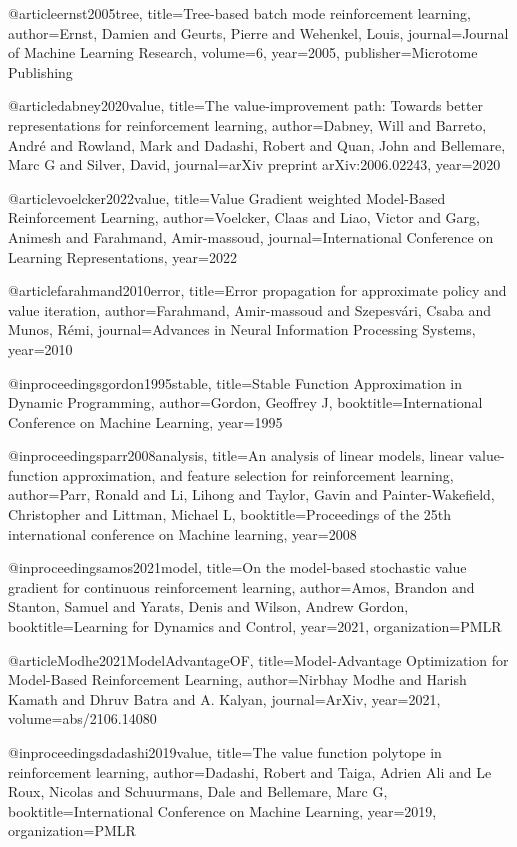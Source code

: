 @article{ernst2005tree,
  title={Tree-based batch mode reinforcement learning},
  author={Ernst, Damien and Geurts, Pierre and Wehenkel, Louis},
  journal={Journal of Machine Learning Research},
  volume={6},
  year={2005},
  publisher={Microtome Publishing}
}

@article{dabney2020value,
  title={The value-improvement path: Towards better representations for reinforcement learning},
  author={Dabney, Will and Barreto, Andr{\'e} and Rowland, Mark and Dadashi, Robert and Quan, John and Bellemare, Marc G and Silver, David},
  journal={arXiv preprint arXiv:2006.02243},
  year={2020}
}

@article{voelcker2022value,
  title={Value Gradient weighted Model-Based Reinforcement Learning},
  author={Voelcker, Claas and Liao, Victor and Garg, Animesh and Farahmand, Amir-massoud},
  journal={International Conference on Learning Representations},
  year={2022}
}

@article{farahmand2010error,
  title={Error propagation for approximate policy and value iteration},
  author={Farahmand, Amir-massoud and Szepesv{\'a}ri, Csaba and Munos, R{\'e}mi},
  journal={Advances in Neural Information Processing Systems},
  year={2010}
}

@inproceedings{gordon1995stable,
  title={Stable Function Approximation in Dynamic Programming},
  author={Gordon, Geoffrey J},
  booktitle={International Conference on Machine Learning},
  year={1995}
}

@inproceedings{parr2008analysis,
  title={An analysis of linear models, linear value-function approximation, and feature selection for reinforcement learning},
  author={Parr, Ronald and Li, Lihong and Taylor, Gavin and Painter-Wakefield, Christopher and Littman, Michael L},
  booktitle={Proceedings of the 25th international conference on Machine learning},
  year={2008}
}

@inproceedings{amos2021model,
  title={On the model-based stochastic value gradient for continuous reinforcement learning},
  author={Amos, Brandon and Stanton, Samuel and Yarats, Denis and Wilson, Andrew Gordon},
  booktitle={Learning for Dynamics and Control},
  year={2021},
  organization={PMLR}
}

@article{Modhe2021ModelAdvantageOF,
  title={Model-Advantage Optimization for Model-Based Reinforcement Learning},
  author={Nirbhay Modhe and Harish Kamath and Dhruv Batra and A. Kalyan},
  journal={ArXiv},
  year={2021},
  volume={abs/2106.14080}
}

@inproceedings{dadashi2019value,
  title={The value function polytope in reinforcement learning},
  author={Dadashi, Robert and Taiga, Adrien Ali and Le Roux, Nicolas and Schuurmans, Dale and Bellemare, Marc G},
  booktitle={International Conference on Machine Learning},
  year={2019},
  organization={PMLR}
}

